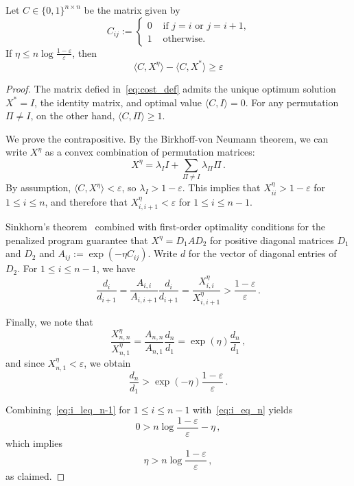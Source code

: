 \documentclass[final,12pt]{colt2018}
\newcommand{\1}{\mathds{1}}
\newcommand*{\ep}{\varepsilon}
\begin{document}
\begin{theorem}
Let $C \in \{0, 1\}^{n \times n}$ be the matrix given by
\begin{equation}\label{eq:cost_def}
C_{ij} := \left\{\begin{array}{ll}
0 & \text{ if $j = i$ or $j = i+1$,} \\
1 & \text{ otherwise.}
\end{array}\right.
\end{equation}
If $\eta \leq n \log \frac{1-\ep}{\ep}$,
then
\begin{equation*}
\langle C, X^\eta \rangle - \langle C, X^* \rangle \geq \ep
\end{equation*}
\end{theorem}
\begin{proof}
The matrix defied in~\eqref{eq:cost_def} admits the unique optimum solution $X^* = I$, the identity matrix, and optimal value $\langle C, I \rangle = 0$.
For any permutation $\Pi \neq I$, on the other hand, $\langle C, \Pi \rangle \geq 1$.

We prove the contrapositive.
By the Birkhoff-von Neumann theorem, we can write $X^\eta$ as a convex combination of permutation matrices:
\begin{equation*}
X^\eta = \lambda_I I + \sum_{\Pi \neq I} \lambda_\Pi \Pi\,.
\end{equation*}
By assumption, $\langle C, X^\eta \rangle < \ep$, so $\lambda_I > 1 - \ep$.
This implies that $X^\eta_{ii} > 1-\ep$ for $1 \leq i \leq n$, and therefore that $X^\eta_{i, i+1} < \ep$ for $1 \leq i \leq n-1$.

Sinkhorn's theorem~\citep{Sin67} combined with first-order optimality conditions for the penalized program guarantee that $X^\eta = D_1 A D_2$ for positive diagonal matrices $D_1$ and $D_2$ and $A_{ij} := \exp(- \eta C_{ij})$.
Write $d$ for the vector of diagonal entries of $D_2$.
For $1 \leq i \leq n-1$, we have
\begin{equation}\label{eq:i_leq_n-1}
\frac{d_i}{d_{i+1}} = \frac{A_{i,i}}{A_{i, i+1}}\frac{d_i}{d_{i+1}} = \frac{X^\eta_{i,i}}{X^\eta_{i, i+1}} > \frac{1-\ep}{\ep}\,.
\end{equation}

Finally, we note that
\begin{equation*}
\frac{X^\eta_{n, n}}{X^\eta_{n, 1}} = \frac{A_{n,n}}{A_{n, 1}}\frac{d_n}{d_{1}} = \exp(\eta) \frac{d_n}{d_{1}}\,,
\end{equation*}
and since $X^\eta_{n, 1} < \ep$, we obtain
\begin{equation}\label{eq:i_eq_n}
\frac{d_n}{d_1} > \exp(-\eta) \frac{1-\ep}{\ep}\,.
\end{equation}

Combining~\eqref{eq:i_leq_n-1} for $1 \leq i \leq n-1$ with~\eqref{eq:i_eq_n} yields
\begin{equation*}
0 > n \log \frac{1-\ep}{\ep} - \eta\,,
\end{equation*}
which implies
\begin{equation*}
\eta > n \log \frac{1-\ep}{\ep}\,,
\end{equation*}
as claimed.
\end{proof}
\end{document}
